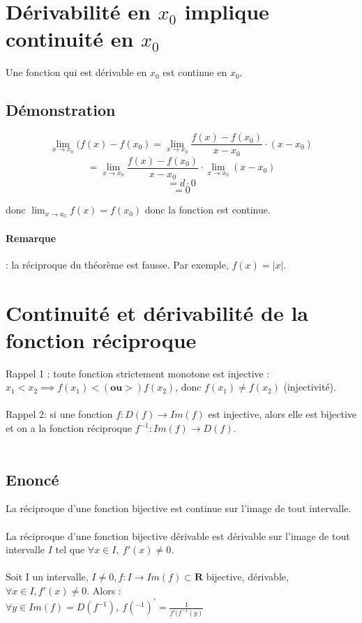 \documentclass{article}
\begin{document}
\newpage

\section{Dérivabilité en $x_0$ implique continuité en $x_0$}

Une fonction qui est dérivable en $x_0$ est continue en $x_0$.

\subsection{Démonstration}

\[ \lim_{x\to{x_0}} (f(x) - f(x_0) = \lim_{x\to{x_0}} \frac{f(x) - f(x_0)}{x-{x_0}} \cdot (x-{x_0}) \]
\[ = \lim_{x\to{x_0}} \frac{f(x) - f(x_0)}{x-{x_0}} \cdot \lim_{x\to{x_0}} (x-{x_0})\]
\[ = d \cdot 0 \]
\[ = 0 \]

donc $ \lim_{x\to{x_0}} f(x) = f(x_0) $ donc la fonction est continue.
\paragraph{Remarque}: la réciproque du théorème est fausse. Par exemple, $ f(x) = |x| $.

\newpage

\section{Continuité et dérivabilité de la fonction réciproque}

Rappel 1 : toute fonction strictement monotone est injective :\\
$ x_1 < x_2 \implies f(x_1) < (\textbf{ou} >) f(x_2) $, donc $ f(x_1) \neq f(x_2) $ (injectivité).\\\\
Rappel 2: si une fonction $ f: D(f) \to Im(f) $ est injective, alors elle est bijective et on a la fonction réciproque $ f^{-1} : Im(f) \to D(f) $.\\\\

\subsection{Enoncé}

La réciproque d'une fonction bijective est continue sur l'image de tout intervalle.\\\\
La réciproque d'une fonction bijective dérivable est dérivable sur l'image de tout intervalle $ I $ tel que $ \forall x \in I,\ f'(x) \neq 0 $.\\\\
Soit I un intervalle, $ I \neq 0, f : I \to Im(f) \subset \mathbf{R} $ bijective, dérivable, $ \forall x \in I, f'(x) \neq 0 $. Alors :\\
$ \forall y \in Im(f) = D(f^{-1}),\ f(^{-1})^{'} = \frac{1}{f'(f^{-1}(y)} $\\\\
\end{document}
